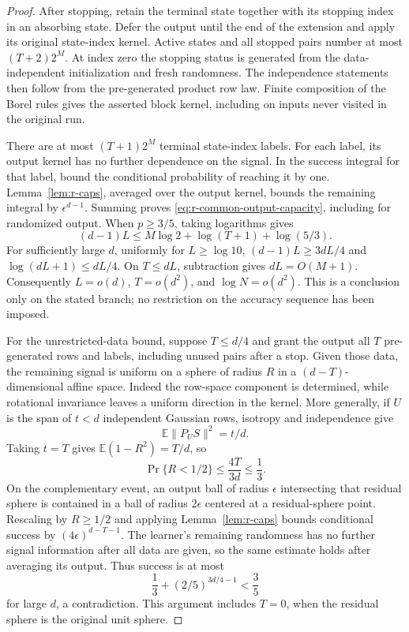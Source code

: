 \begin{proof}
After stopping, retain the terminal state together with its stopping
index in an absorbing state.  Defer the output until the end of the
extension and apply its original state-index kernel.  Active states
and all stopped pairs number at most \((T+2)2^M\).  At index zero the
stopping status is generated from the data-independent initialization
and fresh randomness.  The independence statements then follow from
the pre-generated product row law.  Finite composition of the Borel
rules gives the asserted block kernel, including on inputs never
visited in the original run.

There are at most \((T+1)2^M\) terminal state-index labels.
For each label, its output kernel has no further dependence on the
signal.  In the success integral for that label, bound the conditional
probability of reaching it by one.  Lemma~\ref{lem:r-caps}, averaged
over the output kernel, bounds the remaining integral by
\(\epsilon^{d-1}\).  Summing proves
\eqref{eq:r-common-output-capacity}, including for randomized output.
When \(p\ge3/5\), taking logarithms gives
\[
 (d-1)L\le M\log2+\log(T+1)+\log(5/3).
\]
For sufficiently large \(d\), uniformly for \(L\ge\log10\),
\((d-1)L\ge3dL/4\) and \(\log(dL+1)\le dL/4\).
On \(T\le dL\), subtraction gives \(dL=O(M+1)\).
Consequently \(L=o(d)\), \(T=o(d^2)\), and
\(\log N=o(d^2)\).  This is a conclusion only on the stated
branch; no restriction on the accuracy sequence has been imposed.

For the unrestricted-data bound, suppose \(T\le d/4\) and grant
the output all \(T\) pre-generated rows and labels, including unused
pairs after a stop.  Given those data, the remaining signal is uniform
on a sphere of radius \(R\) in a \((d-T)\)-dimensional affine space.
Indeed the row-space component is determined, while rotational
invariance leaves a uniform direction in the kernel.  More generally,
if \(U\) is the span of \(t<d\) independent Gaussian rows, isotropy
and independence give
\begin{equation}\label{rlevels:residual-mean}
 \mathbb E\|P_US\|^2=t/d.
\end{equation}
Taking \(t=T\) gives \(\mathbb E(1-R^2)=T/d\), so
\[
 \Pr\{R<1/2\}\le\frac{4T}{3d}\le\frac13.
\]
On the complementary event, an output ball of radius \(\epsilon\)
intersecting that residual sphere is contained in a ball of radius
\(2\epsilon\) centered at a residual-sphere point.  Rescaling by
\(R\ge1/2\) and applying Lemma~\ref{lem:r-caps} bounds conditional
success by \((4\epsilon)^{d-T-1}\).  The learner's remaining
randomness has no further signal information after all data are given,
so the same estimate holds after averaging its output.  Thus success
is at most
\[
 \frac13+(2/5)^{3d/4-1}<\frac35
\]
for large \(d\), a contradiction.  This argument includes \(T=0\),
when the residual sphere is the original unit sphere.
\end{proof}

